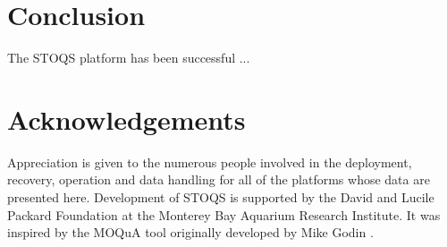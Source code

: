 \documentclass[conference]{IEEEtran}
\begin{document}



\section{Conclusion}
The STOQS platform has been successful ...







\section*{Acknowledgements}

Appreciation is given to the numerous people involved in the deployment, recovery, operation and data handling for all of the platforms whose data are presented here. Development of STOQS is supported by the David and Lucile Packard Foundation at the Monterey Bay Aquarium Research Institute. It was inspired by the MOQuA tool originally developed by Mike Godin \cite{godin05}.








%




\end{document}
